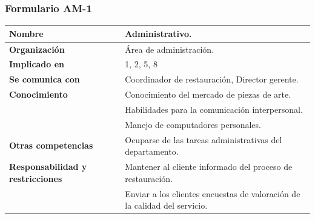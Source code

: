 \documentclass[a4paper,11pt]{article}
\begin{document}
			\subsubsection{Formulario AM-1}
			\begin{center}
				\begin{tabular}{| l | p{5.5cm} |}
					\hline
					\cellcolor[RGB]{224,233,250}\textbf{Nombre} & Administrativo.\\
					\hline
					\cellcolor[RGB]{224,233,250}\textbf{Organización} & Área de
					administración.\\
					\hline
					\cellcolor[RGB]{224,233,250}\textbf{Implicado en} & 1, 2, 5, 8\\
					\hline
					\cellcolor[RGB]{224,233,250}\textbf{Se comunica con} & Coordinador de
					restauración, Director gerente.\\
					\hline
					\cellcolor[RGB]{224,233,250}\textbf{Conocimiento} & Conocimiento del
					mercado de piezas de arte.\\
					\cellcolor[RGB]{224,233,250}& Habilidades para la comunicación
					interpersonal.\\
					\cellcolor[RGB]{224,233,250}& Manejo de computadores personales.\\
					\hline
					\cellcolor[RGB]{224,233,250}\textbf{Otras competencias} & Ocuparse de las
					tareas administrativas del departamento.\\
					\hline
					\cellcolor[RGB]{224,233,250}\textbf{Responsabilidad y restricciones} &
					Mantener al cliente informado del proceso de restauración.\\
					\cellcolor[RGB]{224,233,250}& Enviar a los clientes encuestas de valoración
					de la calidad del servicio.\\
					\hline
				\end{tabular}
			\end{center}
\end{document}
